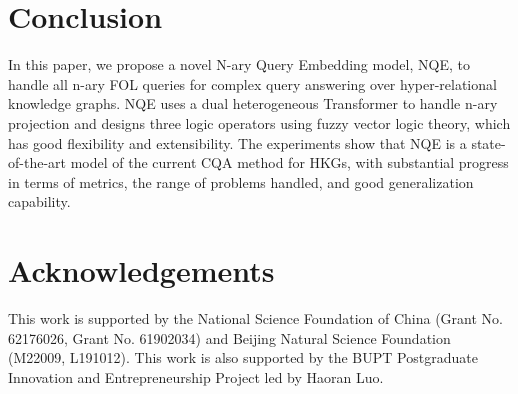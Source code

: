 \documentclass[letterpaper]{article} \usepackage{aaai23}  \usepackage{times}  \usepackage{helvet}  \usepackage{courier}  \usepackage[hyphens]{url}  \usepackage{graphicx} \urlstyle{rm} \def\UrlFont{\rm}  \usepackage{natbib}  \usepackage{caption} \frenchspacing  \setlength{\pdfpagewidth}{8.5in}  \setlength{\pdfpageheight}{11in}  \usepackage{algorithm}
\begin{document}
\section{Conclusion}
In this paper, we propose a novel N-ary Query Embedding model, NQE, to handle all n-ary FOL queries for complex query answering over hyper-relational knowledge graphs. NQE uses a dual heterogeneous Transformer to handle n-ary projection and designs three logic operators using fuzzy vector logic theory, which has good flexibility and extensibility. The experiments show that NQE is a state-of-the-art model of the current CQA method for HKGs, with substantial progress in terms of metrics, the range of problems handled, and good generalization capability. 


\section*{Acknowledgements}
This work is supported by the National Science Foundation of China (Grant No. 62176026, Grant No. 61902034) and Beijing Natural Science Foundation (M22009, L191012). This work is also supported by the BUPT Postgraduate Innovation and Entrepreneurship Project led by Haoran Luo.



\end{document}
